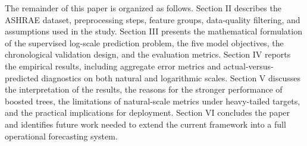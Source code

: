 \documentclass[conference]{IEEEtran}
\begin{document}
The remainder of this paper is organized as follows. Section II describes the ASHRAE dataset, preprocessing steps, feature groups, data-quality filtering, and assumptions used in the study. Section III presents the mathematical formulation of the supervised log-scale prediction problem, the five model objectives, the chronological validation design, and the evaluation metrics. Section IV reports the empirical results, including aggregate error metrics and actual-versus-predicted diagnostics on both natural and logarithmic scales. Section V discusses the interpretation of the results, the reasons for the stronger performance of boosted trees, the limitations of natural-scale metrics under heavy-tailed targets, and the practical implications for deployment. Section VI concludes the paper and identifies future work needed to extend the current framework into a full operational forecasting system.
\end{document}
